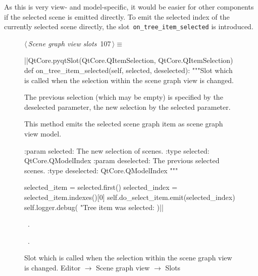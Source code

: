 \documentclass[%
    a4paper,    %
    justified,  %
    nobib,      %
    openany     %
]{tufte-book}
\makeatletter
\renewcommand{\label}[1]{\@tufte@label{##1}}%
\makeatother
\begin{document}
As this is very view- and model-specific, it would be easier for other
components if the selected scene is emitted directly. To emit the selected index
of the currently selected scene directly, the slot~\verb=on_tree_item_selected=
is introduced.

\begin{figure}[!htbp]
\begin{flushleft} \small
\begin{minipage}{\linewidth}\label{scrap42}\raggedright\small
{} $\langle\,${\itshape Scene graph view slots}\nobreak\ {\footnotesize {107}}$\,\rangle\equiv$
\vspace{-1ex}
\begin{pythoncode}
|\normalfont{}\fontfamily{}|QtCore.pyqtSlot(QtCore.QItemSelection, QtCore.QItemSelection)
def on_tree_item_selected(self, selected, deselected):
    """Slot which is called when the selection within the scene
    graph view is changed.

    The previous selection (which may be empty) is specified by
    the deselected parameter, the new selection by the selected
    parameter.

    This method emits the selected scene graph item as scene
    graph view model.

    :param selected: The new selection of scenes.
    :type  selected: QtCore.QModelIndex
    :param deselected: The previous selected scenes.
    :type  deselected: QtCore.QModelIndex
    """

    selected_item = selected.first()
    selected_index = selected_item.indexes()[0]
    self.do_select_item.emit(selected_index)
    self.logger.debug(
        "Tree item was selected: %
    )|\NWsep|
\end{pythoncode}
\vspace{1.5ex}
\footnotesize
\begin{list}{}{\setlength{\itemsep}{-\parsep}\setlength{\itemindent}{-\leftmargin}}
\item \NWtxtMacroDefBy\ .
\item \NWtxtMacroRefIn\ .

\item{}
\end{list}
\end{minipage}\vspace{4ex}
\end{flushleft}
\caption{Slot which is called when the selection within the scene graph view is
  changed.
  \newline{}\newline{}Editor $\rightarrow$ Scene graph view
  $\rightarrow$ Slots}
\end{figure}
\end{document}
